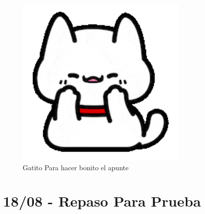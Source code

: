 \documentclass[12pt, letterpaper]{article}
\begin{document}
\begin{figure}[h!]
	\centering
	\includegraphics[width=0.75\textwidth]{Gat}
	\caption{Gatito Para hacer bonito el apunte}
	\label{fig:Gat}
\end{figure}
\newpage




\section{18/08 - Repaso Para Prueba}
\end{document}
